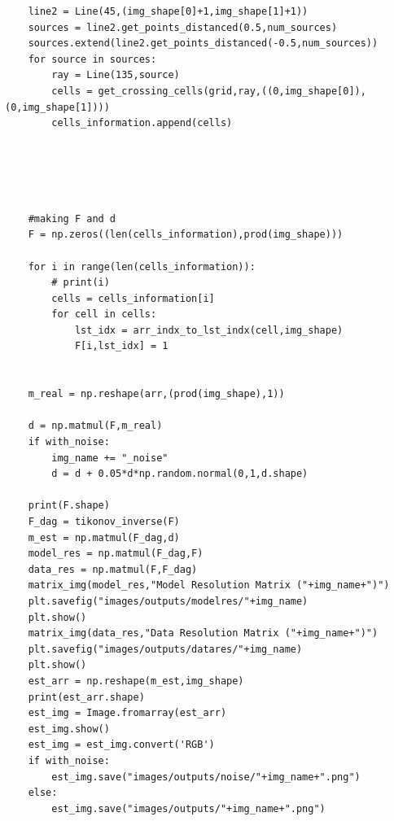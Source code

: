 \documentclass{article}
\begin{document}
\begin{verbatim}
    line2 = Line(45,(img_shape[0]+1,img_shape[1]+1))
    sources = line2.get_points_distanced(0.5,num_sources)
    sources.extend(line2.get_points_distanced(-0.5,num_sources))
    for source in sources:
        ray = Line(135,source)
        cells = get_crossing_cells(grid,ray,((0,img_shape[0]),(0,img_shape[1])))
        cells_information.append(cells)





    #making F and d
    F = np.zeros((len(cells_information),prod(img_shape)))

    for i in range(len(cells_information)):
        # print(i)
        cells = cells_information[i] 
        for cell in cells:
            lst_idx = arr_indx_to_lst_indx(cell,img_shape)
            F[i,lst_idx] = 1


    m_real = np.reshape(arr,(prod(img_shape),1))

    d = np.matmul(F,m_real)
    if with_noise:
        img_name += "_noise"
        d = d + 0.05*d*np.random.normal(0,1,d.shape)

    print(F.shape)
    F_dag = tikonov_inverse(F)
    m_est = np.matmul(F_dag,d)
    model_res = np.matmul(F_dag,F)
    data_res = np.matmul(F,F_dag)
    matrix_img(model_res,"Model Resolution Matrix ("+img_name+")")
    plt.savefig("images/outputs/modelres/"+img_name)
    plt.show()
    matrix_img(data_res,"Data Resolution Matrix ("+img_name+")")
    plt.savefig("images/outputs/datares/"+img_name)
    plt.show()
    est_arr = np.reshape(m_est,img_shape)
    print(est_arr.shape)
    est_img = Image.fromarray(est_arr)
    est_img.show()
    est_img = est_img.convert('RGB')
    if with_noise:
        est_img.save("images/outputs/noise/"+img_name+".png")
    else:
        est_img.save("images/outputs/"+img_name+".png")

\end{verbatim}
\end{document}
